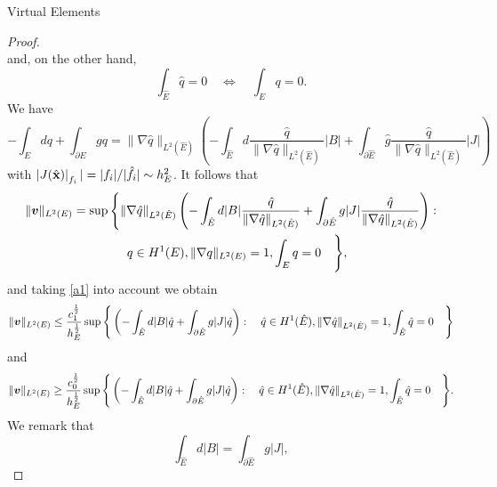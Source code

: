\begin{chapter}{Virtual Elements}
\begin{proof}
\begin{equation}
\end{equation}
and, on the other hand,
\[
\int_{\hat E}\hat q =0\quad \Longleftrightarrow \quad\int_Eq=0.
\]
We have
\[
-\int_Edq + \int_{\partial E}gq = \|\nabla \hat q\|_{L^2(\hat E)}\left(-\int_{\hat E}d\frac{\hat q}{\|\nabla\hat q\|_{L^2(\hat E)}}|B| + \int_{\partial \hat E}\hat g\frac{\hat q}{\|\nabla\hat q\|_{L^2(\hat E)}} |J|\right)
\]
with $\left|J(\hat{\bf x})\right|_{f_i}|= |f_i|/|\hat f_i|\sim h_E^2$. It follows that
\begin{multline*}
\|\boldsymbol{v}\|_{L^2(E)}=\sup\Bigg\{\|\nabla \hat q\|_{L^2(\hat E)}\left(-\int_{\hat E}d|B|\frac{\hat q}{\|\nabla\hat q\|_{L^2(\hat E)}} + \int_{\partial \hat E}g|J|\frac{\hat q}{\|\nabla\hat q\|_{L^2(\hat E)}} \right):\\ \quad q\in H^1(E),\|\nabla q\|_{L^2(E)}=1,\int_Eq=0\quad\Bigg\},
\end{multline*}
and taking \eqref{a1} into account we obtain
\begin{equation}\label{mult1}
\|\boldsymbol{v}\|_{L^2(E)}\le  \frac{c_1^\frac12}{h_E^\frac12}\sup\Bigg\{\left(-\int_{\hat E}d|B|\hat q + \int_{\partial \hat E}g|J|\hat q \right): \quad \hat q\in H^1(\hat E),\|\nabla \hat q\|_{L^2(\hat E)}=1,\int_{\hat E}\hat q=0\quad\Bigg\}
\end{equation}
and 
\begin{equation}\label{mult2}
\|\boldsymbol{v}\|_{L^2(E)}\ge  \frac{c_0^\frac12}{h_E^\frac12}\sup\Bigg\{\left(-\int_{\hat E}d|B|\hat q + \int_{\partial \hat E}g|J|\hat q \right): \quad \hat q\in H^1(\hat E),\|\nabla \hat q\|_{L^2(\hat E)}=1,\int_{\hat E}\hat q=0\quad\Bigg\}.
\end{equation}
We remark that
\[
\int_{\hat E}d|B|=\int_{\partial\hat E}g|J|,
\]
\end{proof}
\end{chapter}
